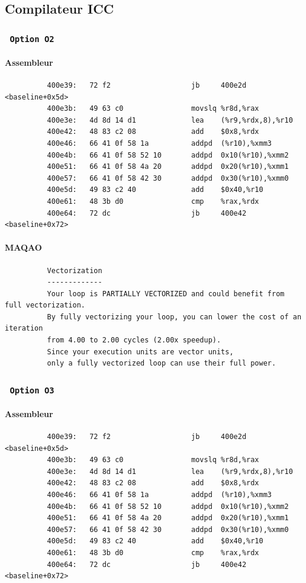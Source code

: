 \documentclass{report}
\begin{document}
      \subsection{Compilateur ICC}
      \subsubsection{ \texttt{ Option O2 } }
      \paragraph{Assembleur}
        \begin{verbatim}
          400e39:	72 f2                	jb     400e2d <baseline+0x5d>
          400e3b:	49 63 c0             	movslq %r8d,%rax
          400e3e:	4d 8d 14 d1          	lea    (%r9,%rdx,8),%r10
          400e42:	48 83 c2 08          	add    $0x8,%rdx
          400e46:	66 41 0f 58 1a       	addpd  (%r10),%xmm3
          400e4b:	66 41 0f 58 52 10    	addpd  0x10(%r10),%xmm2
          400e51:	66 41 0f 58 4a 20    	addpd  0x20(%r10),%xmm1
          400e57:	66 41 0f 58 42 30    	addpd  0x30(%r10),%xmm0
          400e5d:	49 83 c2 40          	add    $0x40,%r10
          400e61:	48 3b d0             	cmp    %rax,%rdx
          400e64:	72 dc                	jb     400e42 <baseline+0x72>
        \end{verbatim}
      \paragraph{MAQAO}
        \begin{verbatim}
          Vectorization
          -------------
          Your loop is PARTIALLY VECTORIZED and could benefit from full vectorization.
          By fully vectorizing your loop, you can lower the cost of an iteration
          from 4.00 to 2.00 cycles (2.00x speedup).
          Since your execution units are vector units,
          only a fully vectorized loop can use their full power.
        \end{verbatim}
      \subsubsection{ \texttt{ Option O3 }  }
      \paragraph{Assembleur}
        \begin{verbatim}
          400e39:	72 f2                	jb     400e2d <baseline+0x5d>
          400e3b:	49 63 c0             	movslq %r8d,%rax
          400e3e:	4d 8d 14 d1          	lea    (%r9,%rdx,8),%r10
          400e42:	48 83 c2 08          	add    $0x8,%rdx
          400e46:	66 41 0f 58 1a       	addpd  (%r10),%xmm3
          400e4b:	66 41 0f 58 52 10    	addpd  0x10(%r10),%xmm2
          400e51:	66 41 0f 58 4a 20    	addpd  0x20(%r10),%xmm1
          400e57:	66 41 0f 58 42 30    	addpd  0x30(%r10),%xmm0
          400e5d:	49 83 c2 40          	add    $0x40,%r10
          400e61:	48 3b d0             	cmp    %rax,%rdx
          400e64:	72 dc                	jb     400e42 <baseline+0x72>
        \end{verbatim}
\end{document}
